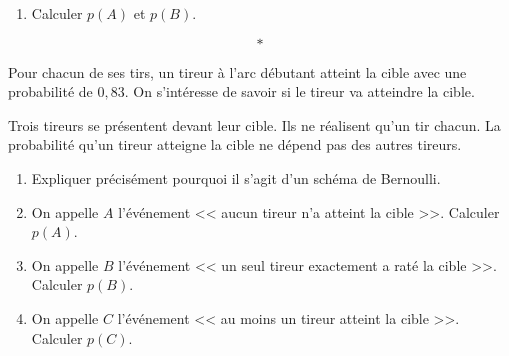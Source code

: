\documentclass[10pt,french]{book}
\begin{document}
\begin{center}
\end{center}

\begin{enumerate}[resume]
    \item Calculer $p(A)$ et $p(B)$.
\end{enumerate}\[*\]

\exo Pour chacun de ses tirs, un tireur à l'arc débutant atteint la cible avec une probabilité de $0,83$. On s'intéresse de savoir si le tireur va atteindre la cible.\par
Trois tireurs se présentent devant leur cible. Ils ne réalisent qu'un tir chacun. La probabilité qu'un tireur atteigne la cible ne dépend pas des autres tireurs.

\begin{enumerate}
    \item Expliquer précisément pourquoi il s'agit d'un schéma de Bernoulli.
    \item On appelle $A$ l'événement << aucun tireur n'a atteint la cible >>. Calculer $p(A)$.
    \item On appelle $B$ l'événement << un seul tireur exactement a raté la cible >>. Calculer $p(B)$.
    \item On appelle $C$ l'événement << au moins un tireur atteint la cible >>. Calculer $p(C)$.
\end{enumerate}
\end{document}
